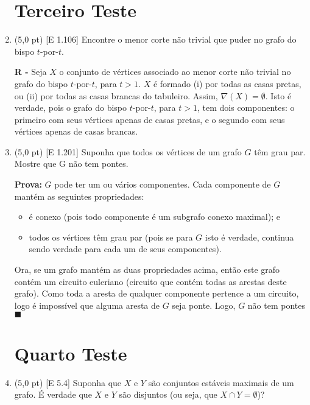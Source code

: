 \documentclass[12pt,a4paper,oneside]{article}
\begin{document}
\begin{enumerate}

	\section*{Terceiro Teste}

	\item (5,0 pt) [E 1.106] Encontre o menor corte não trivial que puder no grafo do bispo $t$-por-$t$.

	\vspace{0.3cm}

	{\color{blue}
		{\bf R -} Seja $X$ o conjunto de vértices associado ao menor corte não trivial no grafo do bispo $t$-por-$t$, para $t > 1$. $X$ é formado (i) por todas as casas pretas, ou (ii) por todas as casas brancas do tabuleiro. Assim, $\nabla (X) = \emptyset$. Isto é verdade, pois o grafo do bispo $t$-por-$t$, para $t > 1$, tem dois componentes: o primeiro com seus vértices apenas de casas pretas, e o segundo com seus vértices apenas de casas brancas.
	}	

	\item (5,0 pt) [E 1.201] Suponha que todos os vértices de um grafo $G$ têm grau par. Mostre que G não tem pontes.
	
	\vspace{0.3cm}

	{\color{blue}
		{\bf Prova:} $G$ pode ter um ou vários componentes. Cada componente de $G$ mantém as seguintes propriedades: 
		\begin{itemize}
			\item é conexo (pois todo componente é um subgrafo conexo maximal); e
			\item todos os vértices têm grau par (pois se para $G$ isto é verdade, continua sendo verdade para cada um de seus componentes).
		\end{itemize}
		Ora, se um grafo mantém as duas propriedades acima, então este grafo contém um circuito euleriano (circuito que contém todas as arestas deste grafo). Como toda a aresta de qualquer componente pertence a um circuito, logo é impossível que alguma aresta de $G$ seja ponte. Logo, $G$ não tem pontes $\blacksquare$
	}
	
	\section*{Quarto Teste}

	\item (5,0 pt) [E 5.4] Suponha que $X$ e $Y$ são conjuntos estáveis maximais de um grafo. É verdade que $X$ e $Y$ são disjuntos (ou seja, que $X \cap Y = \emptyset$)?
	

\end{enumerate}
\end{document}
